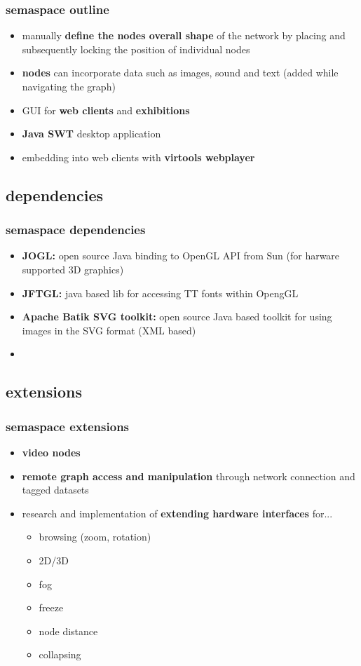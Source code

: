 \documentclass[blue]{beamer}
\begin{document}
\frame
{
\frametitle{\textbf{semaspace outline}}
\begin{itemize}
	\item manually \textbf{define the nodes overall shape} of the network by placing and subsequently locking the position of individual nodes
	\item \textbf{nodes} can incorporate data such as images, sound and text (added while navigating the graph)
	\item GUI for \textbf{web clients} and \textbf{exhibitions}
	\item \textbf{Java SWT} desktop application
	\item embedding into web clients with \textbf{virtools webplayer}
\end{itemize}
}

\subsection{dependencies}
\frame
{
\frametitle{\textbf{semaspace dependencies}}
\begin{itemize}
	\item \textbf{JOGL:} open source Java binding to OpenGL API from Sun (for harware supported 3D graphics)
	\item \textbf{JFTGL:} java based lib for accessing TT fonts within OpengGL
	\item \textbf{Apache Batik SVG toolkit:} open source Java based toolkit for using images in the SVG format (XML based)
	\item \textbf{}
\end{itemize}
}


\subsection{extensions}
\frame
{
\frametitle{\textbf{semaspace extensions}}
\begin{itemize}
	\item \textbf{video nodes}
	\item \textbf{remote graph access and manipulation} through network connection and tagged datasets
	\item research and implementation of \textbf{extending hardware interfaces} for...
		\begin{itemize}[<+-|alert@+>]
			\item browsing (zoom, rotation)
			\item 2D/3D
			\item fog
			\item freeze
			\item node distance
			\item collapsing
		\end{itemize}
\end{itemize}
}
\end{document}
